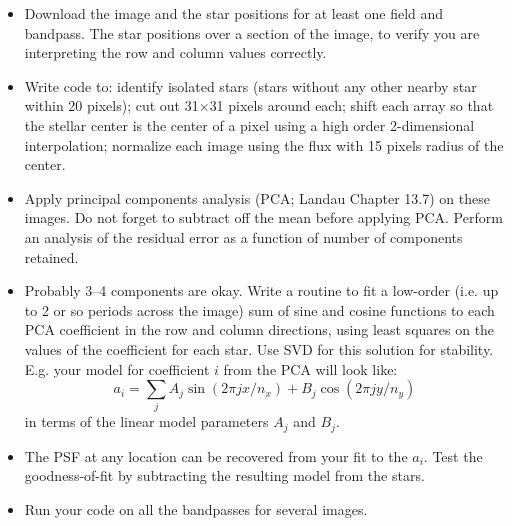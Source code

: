 \documentclass[11pt, preprint]{aastex}
\begin{document}
\begin{itemize}
\item Download the image and the star positions for at least one field
  and bandpass. The star positions over a section of the image, to
  verify you are interpreting the row and column values correctly.
\item Write code to: identify isolated stars (stars without any other
  nearby star within 20 pixels); cut out 31$\times$31 pixels around
  each; shift each array so that the stellar center is the center of a
  pixel using a high order 2-dimensional interpolation; normalize each
  image using the flux with 15 pixels radius of the center. 
\item Apply principal components analysis (PCA; Landau Chapter 13.7)
  on these images. Do not forget to subtract off the mean before
  applying PCA. Perform an analysis of the residual error as a
  function of number of components retained.
\item Probably 3--4 components are okay.  Write a routine to fit a
  low-order (i.e. up to 2 or so periods across the image) sum of sine
  and cosine functions to each PCA coefficient in the row and column
  directions, using least squares on the values of the coefficient for
  each star. Use SVD for this solution for stability. E.g. your model
  for coefficient $i$ from the PCA will look like:
  \begin{equation}
    a_i  = \sum_j A_j \sin(2\pi j x / n_x) + B_j \cos(2\pi j y / n_y)
  \end{equation}
  in terms of the linear model parameters $A_j$ and $B_j$.
\item The PSF at any location can be recovered from your fit to the
  $a_i$. Test the goodness-of-fit by subtracting the resulting model from
  the stars. 
\item Run your code on all the bandpasses for several images. 
\end{itemize}
\end{document}
